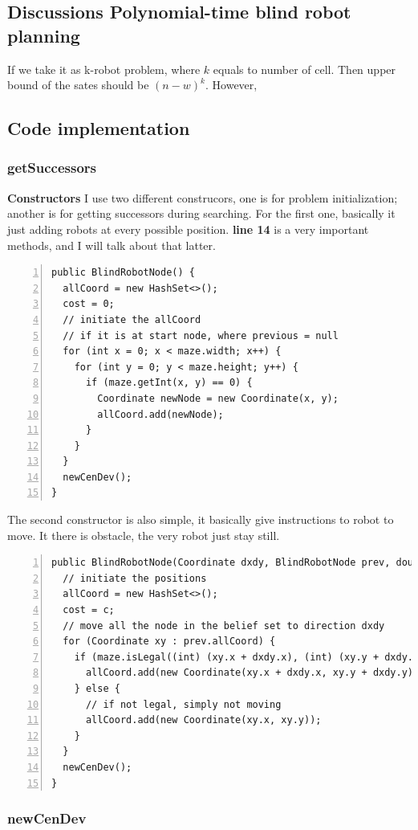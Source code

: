 \subsection{Discussions Polynomial-time blind robot planning}
If we take it as k-robot problem, where $k$ equals to number of cell. Then upper bound of the sates should be $(n-w)^k$. However, 

\subsection{Code implementation}

\subsubsection{getSuccessors}

\textbf{Constructors}
I use two different construcors, one is for problem initialization; another is for getting successors during searching. For the first one, basically it just adding robots at every possible position. \textbf{line 14} is a very important methods, and I will talk about that latter.
\begin{lstlisting}[numbers=left]
public BlindRobotNode() {
  allCoord = new HashSet<>();
  cost = 0;
  // initiate the allCoord
  // if it is at start node, where previous = null
  for (int x = 0; x < maze.width; x++) {
    for (int y = 0; y < maze.height; y++) {
      if (maze.getInt(x, y) == 0) {
        Coordinate newNode = new Coordinate(x, y);
        allCoord.add(newNode);
      }
    }
  }
  newCenDev();
}
\end{lstlisting}
The second constructor is also simple, it basically give instructions to robot to move. It there is obstacle, the very robot just stay still.
\begin{lstlisting}[numbers=left]
public BlindRobotNode(Coordinate dxdy, BlindRobotNode prev, double c) {
  // initiate the positions
  allCoord = new HashSet<>();
  cost = c;
  // move all the node in the belief set to direction dxdy
  for (Coordinate xy : prev.allCoord) {
    if (maze.isLegal((int) (xy.x + dxdy.x), (int) (xy.y + dxdy.y))) {
      allCoord.add(new Coordinate(xy.x + dxdy.x, xy.y + dxdy.y));
    } else {
      // if not legal, simply not moving
      allCoord.add(new Coordinate(xy.x, xy.y));
    }
  }
  newCenDev();
}
\end{lstlisting}

\subsubsection{newCenDev}

